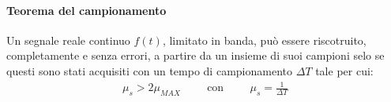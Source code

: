 \documentclass[a4paper, 10pt]{report}
\begin{document}
\noindent{}

\noindent{}

\paragraph*{Teorema del campionamento} Un segnale reale continuo $f(t)$, limitato in banda, può essere riscotruito, completamente e senza errori, a partire da un insieme di suoi campioni selo se questi sono stati acquisiti con un tempo di campionamento $\Delta T$ tale per cui:
\begin{align*}
\mu_s > 2\mu_{MAX} \hspace{1cm}\text{con}\hspace{1cm} \mu_s = \frac{1}{\Delta T}
\end{align*}
\end{document}
